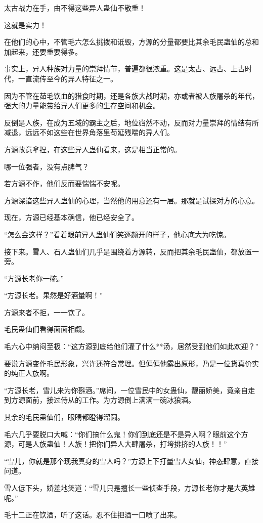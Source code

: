 \begin{this_body}
太古战力在手，由不得这些异人蛊仙不敬重！

这就是实力！

在他们的心中，不管毛六怎么挑拨和诋毁，方源的分量都要比其余毛民蛊仙的总和加起来，还要重要得多。

事实上，异人种族对力量的崇拜情节，普遍都很浓重。这是太古、远古、上古时代，一直流传至今的异人特征之一。

因为不管在茹毛饮血的猎食时期，还是各族大战时期，亦或者被人族屠杀的年代，强大的力量能带给异人们更多的生存空间和机会。

反倒是人族，在成为五域的霸主之后，地位岿然不动，反而对力量崇拜的情结有所减退，远远不如这些在世界角落里苟延残喘的异人们。

方源故意拿捏，在这些异人蛊仙看来，这是相当正常的。

哪一位强者，没有点脾气？

若方源不作，他们反而要惴惴不安呢。

方源深谙这些异人蛊仙的心理，当然他的用意还有一层。那就是试探对方的心意。

现在，方源已经基本确信，他已经安全了。

“怎么会这样？”看着眼前异人蛊仙们笑逐颜开的样子，他心底大为吃惊。

接下来。雪人、石人蛊仙们几乎是围绕着方源转，反而把其余毛民蛊仙，都放置一旁。

“方源长老你一碗。”

“方源长老。果然是好酒量啊！”

方源来者不拒，一一饮了。

毛民蛊仙们看得面面相觑。

毛六心中纳闷至极：“这方源到底给他们灌了什么**汤，居然受到他们如此欢迎？”

要说方源变作毛民形象，兴许还符合常理。但偏偏他露出原形，乃是一位货真价实的纯正人族啊。

“方源长老，雪儿来为你斟酒。”席间，一位雪民中的女蛊仙，靓丽娇美，竟亲自走到方源面前，接过侍从的工作。为方源倒上满满一碗冰狼酒。

其余的毛民蛊仙们，眼睛都瞪得溜圆。

毛六几乎要脱口大喊：“你们搞什么鬼！你们到底还是不是异人啊？眼前这个方源，可是人族蛊仙！人族！把你们异人大肆屠杀，打垮排挤的人族！！”

“雪儿，你就是那个现我真身的雪人吗？”方源上下打量雪人女仙，神态肆意，直接问道。

雪人低下头，娇羞地笑道：“雪儿只是擅长一些侦查手段，方源长老你才是大英雄呢。”

毛十二正在饮酒，听了这话。忍不住把酒一口喷了出来。


\end{this_body}
